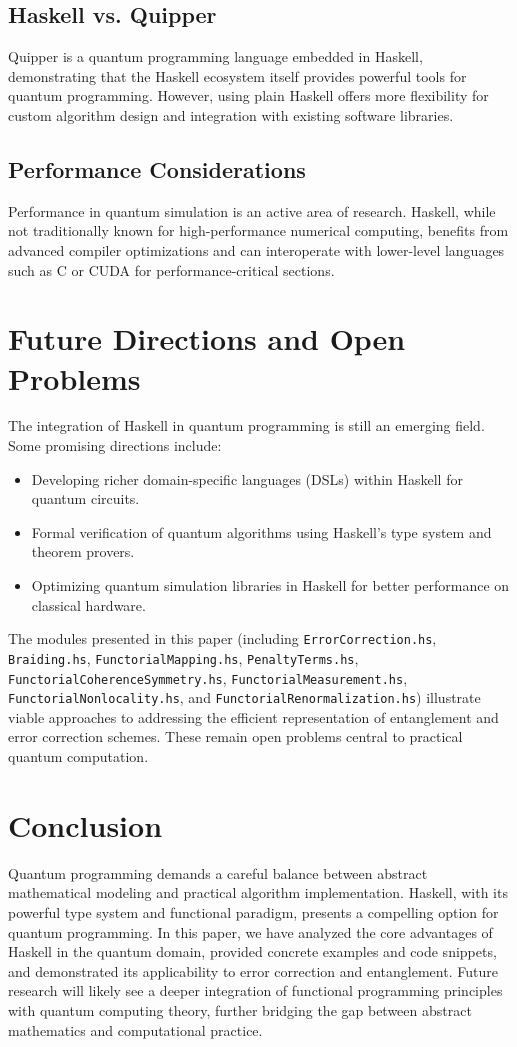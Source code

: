 \documentclass[12pt]{article}
\begin{document}
\subsection{Haskell vs. Quipper}
Quipper is a quantum programming language embedded in Haskell, demonstrating that the Haskell ecosystem itself provides powerful tools for quantum programming. However, using plain Haskell offers more flexibility for custom algorithm design and integration with existing software libraries.

\subsection{Performance Considerations}
Performance in quantum simulation is an active area of research. Haskell, while not traditionally known for high-performance numerical computing, benefits from advanced compiler optimizations and can interoperate with lower-level languages such as C or CUDA for performance-critical sections.

\section{Future Directions and Open Problems}
The integration of Haskell in quantum programming is still an emerging field. Some promising directions include:
\begin{itemize}
    \item Developing richer domain-specific languages (DSLs) within Haskell for quantum circuits.
    \item Formal verification of quantum algorithms using Haskell’s type system and theorem provers.
    \item Optimizing quantum simulation libraries in Haskell for better performance on classical hardware.
\end{itemize}
The modules presented in this paper (including \texttt{ErrorCorrection.hs}, \texttt{Braiding.hs}, \texttt{FunctorialMapping.hs}, \texttt{PenaltyTerms.hs}, \texttt{FunctorialCoherenceSymmetry.hs}, \texttt{FunctorialMeasurement.hs}, \texttt{FunctorialNonlocality.hs}, and \texttt{FunctorialRenormalization.hs}) illustrate viable approaches to addressing the efficient representation of entanglement and error correction schemes. These remain open problems central to practical quantum computation.

\section{Conclusion}
\label{sec:conclusion}
Quantum programming demands a careful balance between abstract mathematical modeling and practical algorithm implementation. Haskell, with its powerful type system and functional paradigm, presents a compelling option for quantum programming. In this paper, we have analyzed the core advantages of Haskell in the quantum domain, provided concrete examples and code snippets, and demonstrated its applicability to error correction and entanglement. Future research will likely see a deeper integration of functional programming principles with quantum computing theory, further bridging the gap between abstract mathematics and computational practice.
\end{document}
